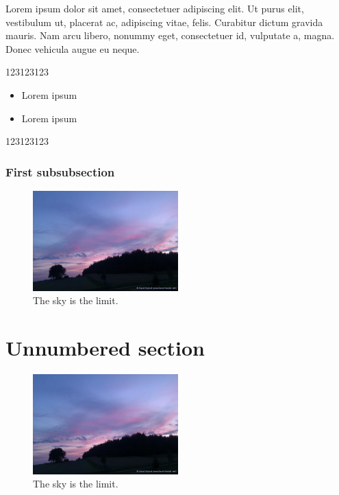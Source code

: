 \documentclass[12pt]{ctexart}
\begin{document}
\leftboxbegin
Lorem ipsum dolor sit amet, consectetuer adipiscing elit. Ut purus elit, vestibulum ut, placerat ac, adipiscing vitae, felis. Curabitur dictum gravida mauris. Nam arcu libero, nonummy eget, consectetuer id, vulputate a, magna. Donec vehicula augue eu neque.
\leftboxend

123123123
\rightboxbegin
\begin{itemize}
 \item Lorem ipsum
 \item Lorem ipsum
\end{itemize}
\rightboxend

123123123

\subsubsection{First subsubsection}

\lipsum[1]

\begin{figure}[!h]
\centering
\includegraphics[width=0.5\textwidth]{opening.jpg}
\caption{The sky is the limit.}
\end{figure}

\section*{Unnumbered section}
\lipsum[1]

\begin{figure}[!h]
\centering
\includegraphics[width=0.5\textwidth]{opening.jpg}
\caption*{The sky is the limit.}
\end{figure}
\end{document}
